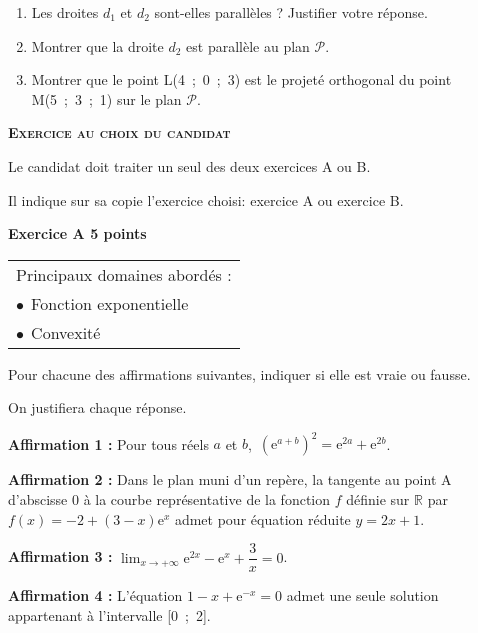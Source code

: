 \documentclass[11pt]{article}
\newcommand{\R}{\mathbb{R}}
\begin{document}
\begin{enumerate}[resume]
\item Les droites $d_1$ et $d_2$ sont-elles parallèles ? Justifier votre réponse.
\item Montrer que la droite $d_2$ est parallèle au plan $\mathcal P$.
\item Montrer que le point L(4~;~0~;~3) est le projeté orthogonal du point M(5~;~3~;~1) sur le plan $\mathcal P$.
\end{enumerate}

\bigskip

\textbf{\textsc{Exercice au choix du candidat}}

Le candidat doit traiter un seul des deux exercices A ou B.

Il indique sur sa copie l'exercice choisi: exercice A ou exercice B.

\bigskip

\textbf{Exercice A  \hfill 5 points}

\smallskip

\begin{tabular}{|l|}\hline
Principaux domaines abordés :\\
\hspace{1.25cm}$\bullet~~$Fonction exponentielle\\
\hspace{1.25cm}$\bullet~~$Convexité\\ \hline
\end{tabular}

\medskip

Pour chacune des affirmations suivantes, indiquer si elle est vraie ou fausse. 

On justifiera chaque réponse. 

\medskip

\textbf{Affirmation 1 :} Pour tous réels $a$ et $b$,\, $\left(\text{e}^{a+b}\right)^2 = \text{e}^{2a} + \text{e}^{2b}$.

\smallskip
\textbf{Affirmation 2 :}  Dans le plan muni d'un repère, la tangente au point A d'abscisse 0 à la courbe représentative de la fonction $f$ définie sur $\R$ par $f(x) = - 2 + (3 - x)\text{e}^x$ admet pour équation réduite $y = 2x + 1$.

\smallskip
\textbf{Affirmation 3 :} $\displaystyle\lim_{x \to + \infty} \text{e}^{2x} - \text{e}^{x} + \dfrac{3}{x}= 0$.

\smallskip
\textbf{Affirmation 4 :} L'équation $1 - x + \text{e}^{-x} = 0$ admet une seule solution appartenant à l'intervalle [0~;~2].
\end{document}
